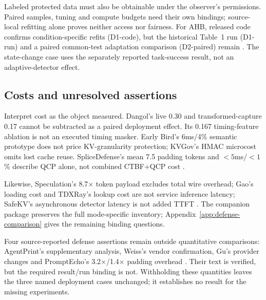 Labeled protected data must also be obtainable under the observer's permissions. Paired samples, tuning and compute budgets need their own bindings; source-local refitting alone proves neither access nor fairness. For AHB, released code confirms condition-specific refits (D1-code), but the historical Table~1 run (D1-run) and a paired common-test adaptation comparison (D2-paired) remain \NRV{} \cite{zhu2026turing}. The state-change case uses the separately reported task-success result, not an adaptive-detector effect.

\subsection{Costs and unresolved assertions}
Interpret cost as the object measured. Dangol's live 0.30 and transformed-capture 0.17 cannot be subtracted as a paired deployment effect. Its 0.167 timing-feature ablation is not an executed timing masker. Early Bird's 6ms/4\% semantic prototype does not price KV-granularity protection; KVGov's HMAC microcost omits lost cache reuse. SpliceDefense's mean 7.5 padding tokens and $<5$ms/$<1$\% describe QCP alone, not combined CTBF+QCP cost \cite{dangol2026workflow,earlybird2025,addagada2026kvgov,spliceleak2026}.

Likewise, Speculation's 8.7$\times$ token payload excludes total wire overhead; Gao's loading cost and TDXRay's lookup cost are not service inference latency; SafeKV's asynchronous detector latency is not added TTFT \cite{wei2024speculation,gao2025iknow,hornetz2026tdxray,chu2025safekv}. The companion package preserves the full mode-specific inventory; Appendix~\ref{app:defense-comparison} gives the remaining binding questions.

Four source-reported defense assertions remain outside quantitative comparisons: AgentPrint's supplementary analysis, Weiss's vendor confirmation, Gu's provider changes and PromptEcho's 3.2$\times$/1.4$\times$ padding overhead \cite{agentprint2025,weiss2024prompt,gu2025promptcaching,prompt_echo2026}. Their text is verified, but the required result/run binding is not. Withholding these quantities leaves the three named deployment cases unchanged; it establishes no result for the missing experiments.
